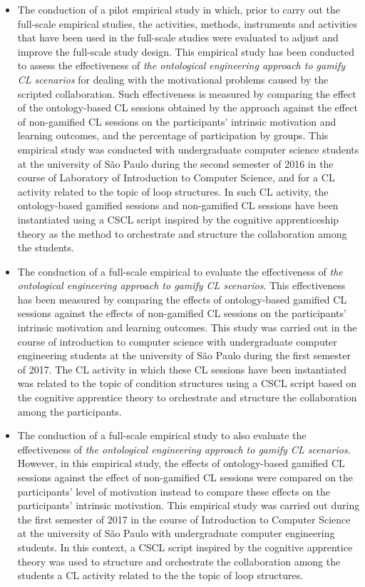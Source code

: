 \begin{description}
\begin{itemize}
\item
The conduction of a pilot empirical study in which, prior to carry out the full-scale empirical studies, the activities, methods, instruments and activities that have been used in the full-scale studies were evaluated to adjust and improve the full-scale study design. This empirical study has been conducted to assess the effectiveness of \emph{the ontological engineering approach to gamify CL scenarios} for dealing with the motivational problems caused by the scripted collaboration. Such effectiveness is measured by comparing the effect of the ontology-based CL sessions obtained by the approach against the effect of non-gamified CL sessions on the participants' intrinsic motivation and learning outcomes, and the percentage of participation by groups. This empirical study was conducted with undergraduate computer science students at the university of São Paulo during the second semester of 2016 in the course of Laboratory of Introduction to Computer Science, and for a CL activity related to the topic of loop structures. In such CL activity, the ontology-based gamified sessions and non-gamified CL sessions have been instantiated using a CSCL script inspired by the cognitive apprenticeship theory as the method to orchestrate and structure the collaboration among the students.

\item
The conduction of a full-scale empirical to evaluate the effectiveness of \emph{the ontological engineering approach to gamify CL scenarios}. This effectiveness has been measured by comparing the effects of ontology-based gamified CL sessions against the effects of non-gamified CL sessions on the participants' intrinsic motivation and learning outcomes. This study was carried out in the course of introduction to computer science with undergraduate computer engineering students at the university of São Paulo during the first semester of 2017. The CL activity in which these CL sessions have been instantiated was related to the topic of condition structures using a CSCL script based on the cognitive apprentice theory to orchestrate and structure the collaboration among the participants.

\item
The conduction of a full-scale empirical study to also evaluate the effectiveness of \emph{the ontological engineering approach to gamify CL scenarios}. However, in this empirical study, the effects of ontology-based gamified CL sessions against the effect of non-gamified CL sessions were compared on the participants' level of motivation instead to compare these effects on the participants' intrinsic motivation. This empirical study was carried out during the first semester of 2017 in the course of Introduction to Computer Science at the university of São Paulo with undergraduate computer engineering students. In this context, a CSCL script inspired by the cognitive apprentice theory was used to structure and orchestrate the collaboration among the students a CL activity related to the the topic of loop structures.


\end{itemize}
\end{description}
